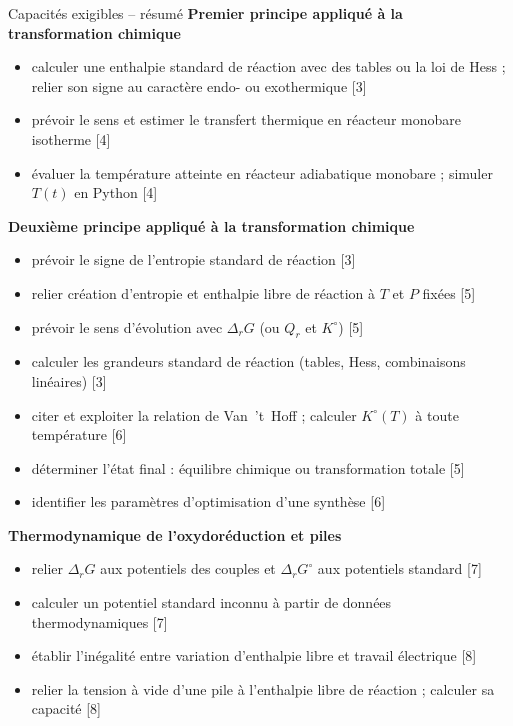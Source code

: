\begin{resultat}{Capacités exigibles -- résumé}
\textbf{Premier principe appliqué à la transformation chimique}
\begin{itemize}
  \item calculer une enthalpie standard de réaction avec des tables ou la loi de Hess ; relier son signe au caractère endo- ou exothermique \hfill[3]
  \item prévoir le sens et estimer le transfert thermique en réacteur monobare isotherme \hfill[4]
  \item évaluer la température atteinte en réacteur adiabatique monobare ; simuler $T(t)$ en Python \hfill[4]
\end{itemize}
\textbf{Deuxième principe appliqué à la transformation chimique}
\begin{itemize}
  \item prévoir le signe de l'entropie standard de réaction \hfill[3]
  \item relier création d'entropie et enthalpie libre de réaction à $T$ et $P$ fixées \hfill[5]
  \item prévoir le sens d'évolution avec $\Delta_r G$ (ou $Q_r$ et $K^\circ$) \hfill[5]
  \item calculer les grandeurs standard de réaction (tables, Hess, combinaisons linéaires) \hfill[3]
  \item citer et exploiter la relation de Van~'t~Hoff ; calculer $K^\circ(T)$ à toute température \hfill[6]
  \item déterminer l'état final : équilibre chimique ou transformation totale \hfill[5]
  \item identifier les paramètres d'optimisation d'une synthèse \hfill[6]
\end{itemize}
\textbf{Thermodynamique de l'oxydoréduction et piles}
\begin{itemize}
  \item relier $\Delta_rG$ aux potentiels des couples et $\Delta_rG^\circ$ aux potentiels standard \hfill[7]
  \item calculer un potentiel standard inconnu à partir de données thermodynamiques \hfill[7]
  \item établir l'inégalité entre variation d'enthalpie libre et travail électrique \hfill[8]
  \item relier la tension à vide d'une pile à l'enthalpie libre de réaction ; calculer sa capacité \hfill[8]
\end{itemize}
\end{resultat}

